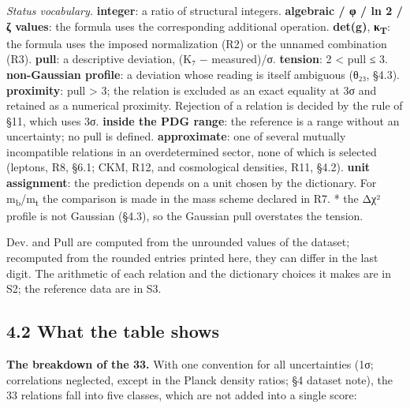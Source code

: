 \documentclass[11pt,a4paper]{article}
\begin{document}
\emph{Status vocabulary.} \textbf{integer}: a ratio of structural integers. \textbf{algebraic / φ / ln 2 / ζ values}: the formula uses the corresponding additional operation. \textbf{det(g)}, \textbf{κ\textsubscript{T}}: the formula uses the imposed normalization (R2) or the unnamed combination (R3). \textbf{pull}: a descriptive deviation, (K₇ − measured)/σ. \textbf{tension}: 2 \textless{} \textbar pull\textbar{} ≤ 3. \textbf{non-Gaussian profile}: a deviation whose reading is itself ambiguous (θ₂₃, §4.3). \textbf{proximity}: \textbar pull\textbar{} \textgreater{} 3; the relation is excluded as an exact equality at 3σ and retained as a numerical proximity. Rejection of a relation is decided by the rule of §11, which uses 3σ. \textbf{inside the PDG range}: the reference is a range without an uncertainty; no pull is defined. \textbf{approximate}: one of several mutually incompatible relations in an overdetermined sector, none of which is selected (leptons, R8, §6.1; CKM, R12, and cosmological densities, R11, §4.2). \textbf{unit assignment}: the prediction depends on a unit chosen by the dictionary. For m\textsubscript{b}/m\textsubscript{t} the comparison is made in the mass scheme declared in R7. * the Δχ² profile is not Gaussian (§4.3), so the Gaussian pull overstates the tension.

Dev. and Pull are computed from the unrounded values of the dataset; recomputed from the rounded entries printed here, they can differ in the last digit. The arithmetic of each relation and the dictionary choices it makes are in S2; the reference data are in S3.

\subsection{4.2 What the table shows}\label{what-the-table-shows}

\textbf{The breakdown of the 33.} With one convention for all uncertainties (1σ; correlations neglected, except in the Planck density ratios; §4 dataset note), the 33 relations fall into five classes, which are not added into a single score:
\end{document}
